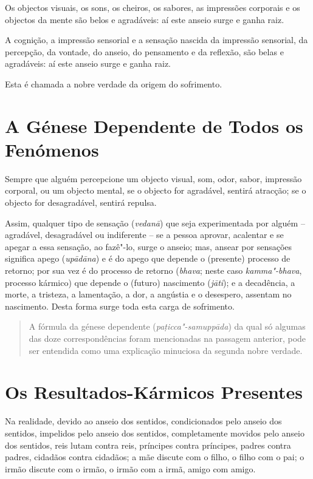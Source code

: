 Os objectos visuais, os sons, os cheiros, os sabores, as impressões corporais e
os objectos da mente são belos e agradáveis: aí este anseio surge e ganha raiz.

A cognição, a impressão sensorial e a sensação nascida da impressão
sensorial, da percepção, da vontade, do anseio, do pensamento e da reflexão, são
belas e agradáveis: aí este anseio surge e ganha raiz.

\enlargethispage{\baselineskip}

Esta é chamada a nobre verdade da origem do sofrimento.


\section{A Génese Dependente de Todos os Fenómenos}

Sempre que alguém percepcione um objecto visual, som, odor, sabor, impressão
corporal, ou um objecto mental, se o objecto for agradável, sentirá atracção; se
o objecto for desagradável, sentirá repulsa.

Assim, qualquer tipo de sensação (\emph{vedanā}) que seja experimentada por
alguém -- agradável, desagradável ou indiferente -- se a pessoa aprovar,
acalentar e se apegar a essa sensação, ao fazê"-lo, surge o anseio; mas, ansear
por sensações significa apego (\emph{upādāna}) e é do apego que depende o
(presente) processo de retorno; por sua vez é do processo de retorno
(\emph{bhava}; neste caso \emph{kamma"-bhava}, processo kármico) que depende o
(futuro) nascimento (\emph{jāti}); e a decadência, a morte, a tristeza, a
lamentação, a dor, a angústia e o desespero, assentam no nascimento. Desta forma
surge toda esta carga de sofrimento.


\begin{quote}
  A fórmula da génese dependente (\emph{pa\d{t}icca"-samuppāda}) da qual só algumas das
  doze correspondências foram mencionadas na passagem anterior, pode ser
  entendida como uma explicação minuciosa da segunda nobre verdade.
\end{quote}

\section{Os Resultados-Kármicos Presentes}

Na realidade, devido ao anseio dos sentidos, condicionados pelo anseio dos
sentidos, impelidos pelo anseio dos sentidos, completamente movidos pelo anseio
dos sentidos, reis lutam contra reis, príncipes contra príncipes, padres contra
padres, cidadãos contra cidadãos; a mãe discute com o filho, o filho com o pai;
o irmão discute com o irmão, o irmão com a irmã, amigo com amigo.


